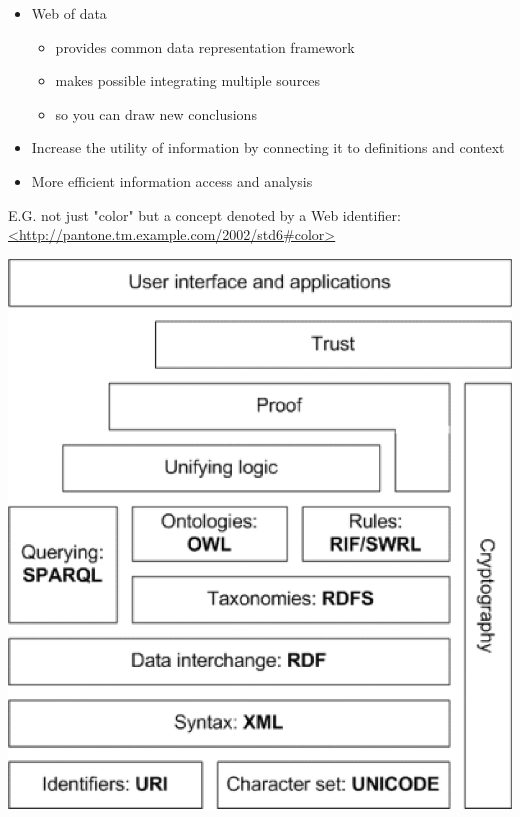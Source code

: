 \documentclass[a4paper,landscape,headrule,footrule,xetex]{foils}
\begin{document}


\maketitle


%




\begin{itemize} 
\item Web of data
  \begin{itemize}
  \item provides common data representation framework
  \item makes possible integrating multiple sources
  \item so you can draw new conclusions
  \end{itemize}
\item  Increase the utility of information by connecting it to definitions and context
\item  More efficient information access and analysis
\end{itemize}

E.G. not just "color" but a concept denoted by a Web identifier: 
\\ \url{<http://pantone.tm.example.com/2002/std6#color>}


\includegraphics[height=\textheight]{../pics/semantic-web-layers.eps}
\end{document}
